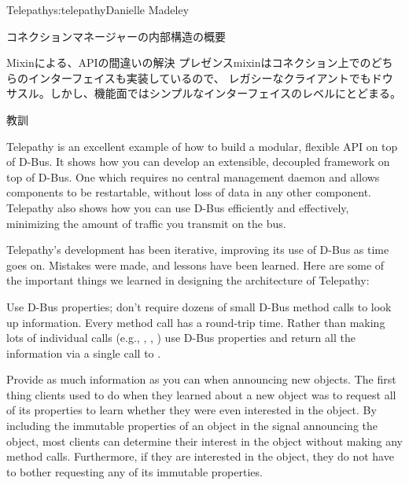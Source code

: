 \begin{aosachapter}{Telepathy}{s:telepathy}{Danielle Madeley}
\begin{aosasect1}{コネクションマネージャーの内部構造の概要}
\begin{aosabox}{Mixinによる、APIの間違いの解決}
プレゼンスmixinはコネクション上でのどちらのインターフェイスも実装しているので、
レガシーなクライアントでもドウサスル。しかし、機能面ではシンプルなインターフェイスのレベルにとどまる。

\end{aosabox}

\end{aosasect1}

\begin{aosasect1}{教訓}

Telepathy is an excellent example of how to build a modular, flexible
API on top of D-Bus. It shows how you can develop an extensible,
decoupled framework on top of D-Bus. One which requires no central
management daemon and allows components to be restartable, without
loss of data in any other component.  Telepathy also shows how you can
use D-Bus efficiently and effectively, minimizing the amount of
traffic you transmit on the bus.

Telepathy's development has been iterative, improving its use of D-Bus
as time goes on. Mistakes were made, and lessons have been learned.
Here are some of the important things we learned in designing the
architecture of Telepathy:

\begin{aosadescription}

  \item{Use D-Bus properties; don't require dozens of small D-Bus
    method calls to look up information.}  Every method call has a
    round-trip time. Rather than making lots of individual calls
    (e.g., , ,
    ) use D-Bus properties and return all the
    information via a single call to .

  \item{Provide as much information as you can when announcing new
    objects.}  The first thing clients used to do when they learned
    about a new object was to request all of its properties to learn
    whether they were even interested in the object. By including the
    immutable properties of an object in the signal announcing the
    object, most clients can determine their interest in the object
    without making any method calls. Furthermore, if they are
    interested in the object, they do not have to bother requesting
    any of its immutable properties.


\end{aosadescription}
\end{aosasect1}
\end{aosachapter}
